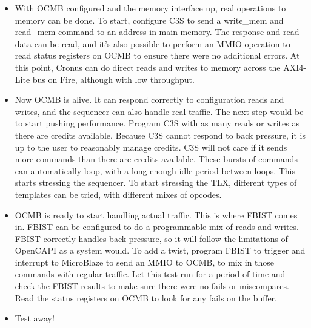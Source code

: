 \begin{itemize}
\item
With OCMB configured and the memory interface up, real operations to
memory can be done. To start, configure C3S to send a write\_mem and
read\_mem command to an address in main memory. The response and
read data can be read, and it's also possible to perform an MMIO
operation to read status registers on OCMB to ensure there were no
additional errors. At this point, Cronus can do direct reads and
writes to memory across the AXI4-Lite bus on Fire, although with low
throughput.

\item
Now OCMB is alive. It can respond correctly to configuration reads and
writes, and the sequencer can also handle real traffic. The next step
would be to start pushing performance. Program C3S with as many reads
or writes as there are credits available. Because C3S cannot respond
to back pressure, it is up to the user to reasonably manage
credits. C3S will not care if it sends more commands than there are
credits available. These bursts of commands can automatically loop, with a
long enough idle period between loops. This starts stressing the
sequencer. To start stressing the TLX, different types of templates
can be tried, with different mixes of opcodes.

\item
OCMB is ready to start handling actual traffic. This is where FBIST
comes in. FBIST can be configured to do a programmable mix of reads
and writes. FBIST correctly handles back pressure, so it will follow
the limitations of OpenCAPI as a system would. To add a twist, program
FBIST to trigger and interrupt to MicroBlaze to send an MMIO to OCMB,
to mix in those commands with regular traffic. Let this test run for a
period of time and check the FBIST results to make sure there were no
fails or miscompares. Read the status registers on OCMB to look for
any fails on the buffer.

\item
Test away!

\end{itemize}
